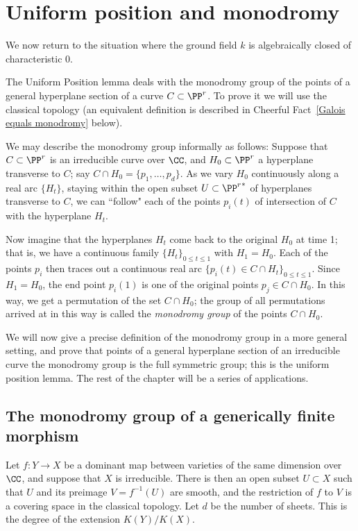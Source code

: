 \section{Uniform position and monodromy} \label{uniformSection}
We now return to the situation where the ground field $k$ is algebraically closed of characteristic 0.

The Uniform Position lemma deals with the monodromy group of the points of a general hyperplane section of a curve $C \subset \PP^r$. To prove it we will use the classical topology (an equivalent definition is described in Cheerful Fact~\ref{Galois equals monodromy} below). 

We may describe the monodromy group informally as follows: Suppose that $C \subset \PP^r$ is an irreducible curve over $\CC$, and $H_0 \subset \PP^r$ a hyperplane transverse to $C$; say $C \cap H_0 = \{p_1,\dots,p_d\}$. As we vary $H_0$ continuously along a real arc $\{H_t\}$, staying within the open subset $U \subset {\PP^r}^*$ of hyperplanes transverse to $C$, we can ``follow" each of the points $p_i(t)$ of intersection of $C$ with the hyperplane $H_t$.

Now imagine that the hyperplanes $H_t$ come back to the original $H_0$ at time 1; that is, we have a continuous family $\{H_t\}_{0 \leq t \leq 1}$ with $H_1 = H_0$. Each of the points $p_i$ then traces out a continuous real arc 
$\{p_i(t) \in C \cap H_t\}_{0 \leq t \leq 1}$. Since $H_1 = H_0$, the end point $p_i(1)$ is one of the original points $p_j \in C \cap H_0$. In this way, we get a permutation of the set $C \cap H_0$; the group of all permutations arrived at in this way is called the \emph{monodromy group} of the points $C \cap H_0$. 

We will now give a precise definition of the monodromy group in a more general setting, and prove that points of a general hyperplane section of an irreducible curve
the monodromy group is the full symmetric group; this is the uniform position lemma. The rest of the chapter will be a series of applications.

\subsection{The monodromy group of a generically finite morphism}

Let $f : Y \to X$ be a dominant map between varieties of the same dimension over $\CC$, and suppose that $X$ is irreducible. There is then an open subset $U \subset X$ such that $U$ and 
its preimage $V = f^{-1}(U)$ are smooth, and the restriction of $f$ to $V$ is a covering space in the classical topology. Let $d$ be the number of sheets. This is the degree of the extension $K(Y)/K(X)$. %

